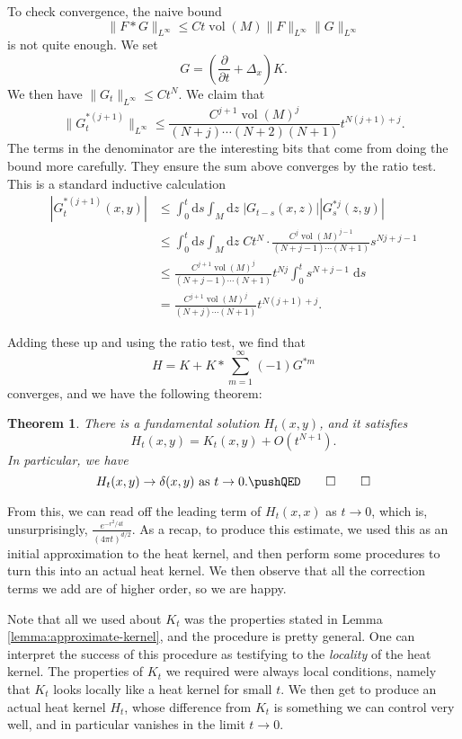 \documentclass{shortart}
\newtheorem{thm}{Theorem}[section]
\theoremstyle{definition}
\renewcommand\d{\mathrm{d}}
\DeclareMathOperator\vol{vol}
\begin{document}
To check convergence, the naive bound
\[
  \|F * G\|_{L^\infty} \leq C t \vol (M) \|F\|_{L^\infty} \|G\|_{L^\infty}
\]
is not quite enough. We set
\[
  G = \left(\frac{\partial}{\partial t} + \Delta_x \right) K.
\]
We then have $\|G_t\|_{L^\infty} \leq C t^N$. We claim that
\[
  \|G^{*(j + 1)}_t\|_{L^\infty} \leq \frac{C^{j + 1} \vol(M)^j}{(N + j) \cdots (N + 2)(N + 1)} t^{N(j + 1) + j}.
\]
The terms in the denominator are the interesting bits that come from doing the bound more carefully. They ensure the sum above converges by the ratio test. This is a standard inductive calculation
\[
  \begin{aligned}
    |G^{*(j + 1)}_t(x, y)| &\leq \int_0^t \d s\int_M \d z\; |G_{t - s}(x, z)| |G_s^{*j}(z, y)|\\
    &\leq \int_0^t \d s\int_M \d z\; C t^N \cdot \frac{C^j \vol(M)^{j - 1}}{(N + j - 1) \cdots (N + 1)} s^{Nj + j - 1}\\
    &\leq \frac{C^{j + 1} \vol(M)^j}{(N + j - 1) \cdots (N + 1)} t^{Nj} \int_0^t s^{N + j - 1}\;\d s\\
    &= \frac{C^{j + 1} \vol(M)^j}{(N + j) \cdots (N + 1)} t^{N(j + 1) + j}.
  \end{aligned}
\]

Adding these up and using the ratio test, we find that
\[
  H = K + K * \sum_{m = 1}^\infty (-1) G^{*m}
\]
converges, and we have the following theorem:
\begin{thm}\label{theorem:iterate-fundamental}
  There is a fundamental solution $H_t(x, y)$, and it satisfies
  \[
    H_t(x, y) = K_t(x, y) + O(t^{N + 1}).
  \]
  In particular, we have
  \[
    H_t(x, y) \to \delta(x, y) \text{ as }t \to 0.\fakeqed
  \]\ifplastex\fakeqed\fi
\end{thm}

From this, we can read off the leading term of $H_t(x, x)$ as $t \to 0$, which is, unsurprisingly, $\frac{e^{-r^2/4t}}{(4\pi t)^{d/2}}$. As a recap, to produce this estimate, we used this as an initial approximation to the heat kernel, and then perform some procedures to turn this into an actual heat kernel. We then observe that all the correction terms we add are of higher order, so we are happy.

Note that all we used about $K_t$ was the properties stated in Lemma \ref{lemma:approximate-kernel}, and the procedure is pretty general. One can interpret the success of this procedure as testifying to the \emph{locality} of the heat kernel. The properties of $K_t$ we required were always local conditions, namely that $K_t$ looks locally like a heat kernel for small $t$. We then get to produce an actual heat kernel $H_t$, whose difference from $K_t$ is something we can control very well, and in particular vanishes in the limit $t \to 0$.
\end{document}
